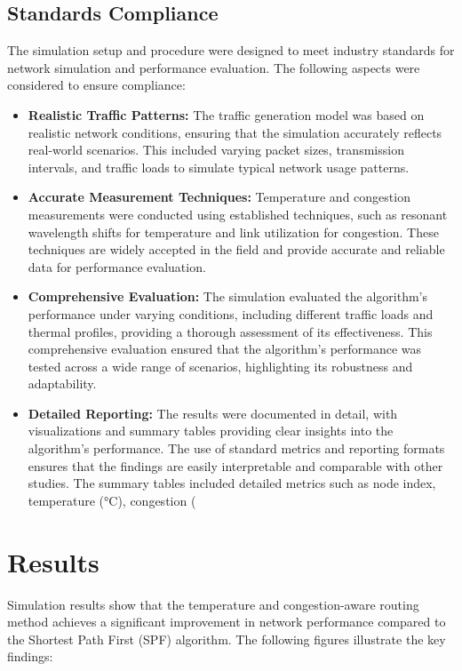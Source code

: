 \documentclass[conference]{IEEEtran}
\begin{document}
\subsection{Standards Compliance}
The simulation setup and procedure were designed to meet industry standards for network simulation and performance evaluation. The following aspects were considered to ensure compliance:
\begin{itemize}
    \item \textbf{Realistic Traffic Patterns:} The traffic generation model was based on realistic network conditions, ensuring that the simulation accurately reflects real-world scenarios. This included varying packet sizes, transmission intervals, and traffic loads to simulate typical network usage patterns.
    \item \textbf{Accurate Measurement Techniques:} Temperature and congestion measurements were conducted using established techniques, such as resonant wavelength shifts for temperature and link utilization for congestion. These techniques are widely accepted in the field and provide accurate and reliable data for performance evaluation.
    \item \textbf{Comprehensive Evaluation:} The simulation evaluated the algorithm's performance under varying conditions, including different traffic loads and thermal profiles, providing a thorough assessment of its effectiveness. This comprehensive evaluation ensured that the algorithm's performance was tested across a wide range of scenarios, highlighting its robustness and adaptability.
    \item \textbf{Detailed Reporting:} The results were documented in detail, with visualizations and summary tables providing clear insights into the algorithm's performance. The use of standard metrics and reporting formats ensures that the findings are easily interpretable and comparable with other studies. The summary tables included detailed metrics such as node index, temperature (°C), congestion (%
\end{itemize}

\section{Results}
Simulation results show that the temperature and congestion-aware routing method achieves a significant improvement in network performance compared to the Shortest Path First (SPF) algorithm. The following figures illustrate the key findings:
\end{document}
